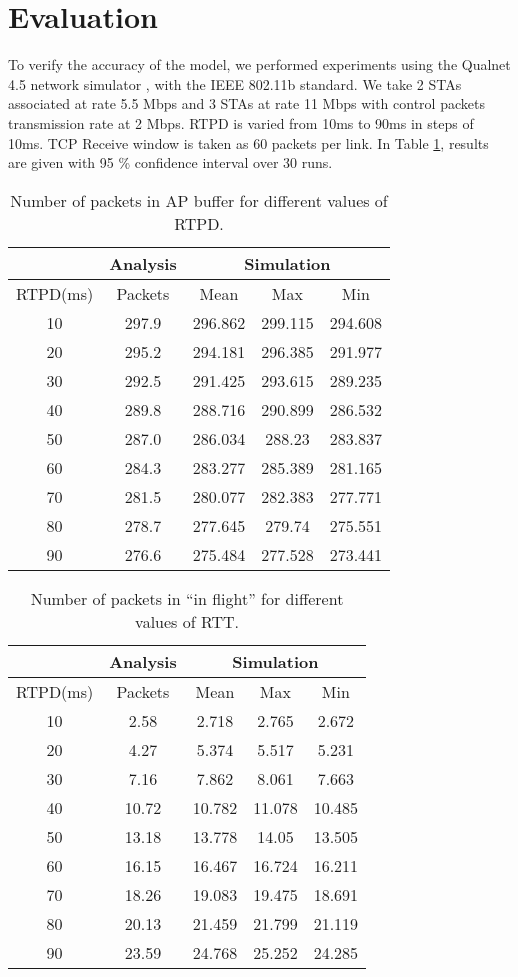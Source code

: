 \documentclass[conference]{IEEEtran}
\begin{document}
\section{Evaluation}\label{sec:Evaluation}
To verify the accuracy of  the model, we performed experiments using the
Qualnet 4.5 network simulator \cite{astn_model:Qualnet}, with the IEEE 802.11b
standard. We take 2 STAs associated  at rate 5.5 Mbps and 3 STAs at rate
11 Mbps with control packets transmission rate at 2 Mbps.
RTPD is varied from 10ms to 90ms in steps of 10ms. TCP Receive window is taken
as 60 packets per link. In Table \ref{table:AP_buffer}, results are given with 95 \% confidence interval over 30 runs.
\begin{table}[ht]
\fontsize{8}{8} \selectfont
\centering \begin{tabular}{|c|c|c|c|c|}
\hline
& Analysis & \multicolumn{3}{|c|}{Simulation} \\ \hline
RTPD(ms) & Packets &	Mean 	&	Max 	&	Min \\
\hline
10		& 	297.9	&	296.862 		&	299.115 		&	294.608 \\
20 		&	295.2	&	294.181 		&	296.385 		&	291.977 \\
30 		&	292.5	&	291.425 		&	293.615 		&	289.235 \\
40		&	289.8	&	288.716 		&	290.899 		&	286.532 \\
50 		&	287.0	&	286.034 		&	288.23  		&	283.837 \\
60 		&	284.3	&	283.277 		&	285.389 		&	281.165 \\
70 		&	281.5	&	280.077 		&	282.383 		&	277.771 \\
80 		&	278.7	&	277.645 		&	279.74  		&	275.551 \\
90 		&	276.6	&	275.484 		&	277.528 		&	273.441 \\
\hline \end{tabular}
\caption{Number of packets in AP buffer for different values of RTPD.} 
\label{table:AP_buffer} \end{table}
\begin{table}[ht]
\fontsize{8}{8} \selectfont
\centering \begin{tabular}{|c|c|c|c|c|}
\hline
& Analysis & \multicolumn{3}{|c|}{Simulation} \\ \hline
RTPD(ms) & Packets &	Mean 	&	Max 	&	Min \\ 
\hline
10	&	2.58	&	2.718	&	2.765	&	2.672	\\
20	&	4.27	&	5.374	&	5.517	&	5.231	\\
30	&	7.16	&	7.862	&	8.061	&	7.663	\\
40	&	10.72	&	10.782	&	11.078	&	10.485	\\
50	&	13.18	&	13.778	&	14.05	&	13.505	\\
60	&	16.15	&	16.467	&	16.724	&	16.211	\\
70	&	18.26	&	19.083	&	19.475	&	18.691	\\
80	&	20.13	&	21.459	&	21.799	&	21.119	\\
90	&	23.59	&	24.768	&	25.252	&	24.285	\\
\hline \end{tabular}
\caption{Number of packets in ``in flight'' for different values of RTT.  } 
\label{table:RTT_buffer} \end{table}
\end{document}

